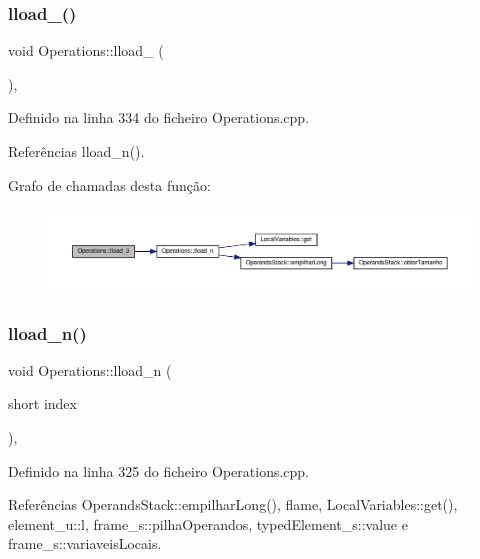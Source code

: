 \subsubsection{\texorpdfstring{lload\+\_()}{lload\_3()}}
{\footnotesize\ttfamily void Operations\+::lload\+\_ (\begin{DoxyParamCaption}{ }\end{DoxyParamCaption})\hspace{0.3cm}{\ttfamily [static]}, {\ttfamily [private]}}



Definido na linha 334 do ficheiro Operations.\+cpp.



Referências lload\+\_\+n().

Grafo de chamadas desta função\+:
\nopagebreak
\begin{figure}[H]
\begin{center}
\leavevmode
\includegraphics[width=350pt]{classOperations_af2f8b1e41b734f43e73d9d6811eb427b_cgraph}
\end{center}
\end{figure}
\mbox{\label{classOperations_a4f70442aed776d9ccae4dfd379715cd4}} 
\subsubsection{\texorpdfstring{lload\+\_\+n()}{lload\_n()}}
{\footnotesize\ttfamily void Operations\+::lload\+\_\+n (\begin{DoxyParamCaption}\item[{short}]{index }\end{DoxyParamCaption})\hspace{0.3cm}{\ttfamily [static]}, {\ttfamily [private]}}



Definido na linha 325 do ficheiro Operations.\+cpp.



Referências Operands\+Stack\+::empilhar\+Long(), flame, Local\+Variables\+::get(), element\+\_\+u\+::l, frame\+\_\+s\+::pilha\+Operandos, typed\+Element\+\_\+s\+::value e frame\+\_\+s\+::variaveis\+Locais.



